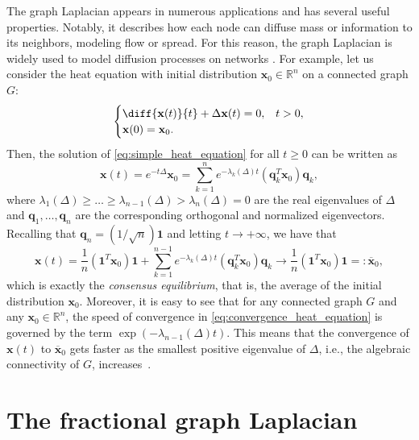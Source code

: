 \documentclass[a4paper,12pt]{article}
\newcommand{\R}{\mathbb{R}}
\newcommand{\xvec}{\mathbf{x}}
\begin{document}
 The graph Laplacian appears in numerous applications and has several useful properties. Notably, it describes how each node can diffuse mass or information to its neighbors, modeling flow or spread. For this reason, the graph Laplacian is widely used to model diffusion processes on networks \cite{Bullo_lectures}.
 For example, let us consider the heat equation with initial distribution $\mathbf{x}_0\in\R^{n}$ on a connected graph $G$:
\begin{equation} \label{eq:simple_heat_equation}
\begin{cases}
    \diff{\mathbf{x}(t)}{t} +\Delta \mathbf{x}(t) =0, & t>0, \\
    \mathbf{x}(0) = \mathbf{x}_0.
\end{cases}
\end{equation}
Then, the solution of \eqref{eq:simple_heat_equation} for all $t\geq0$ can be written as
\begin{equation*}
    \mathbf{x}(t) = e^{-t\Delta} \mathbf{x}_0 = \sum_{k=1}^n e^{-\lambda_k(\Delta)t}(\mathbf{q}_k^T\mathbf{x}_0)\mathbf{q}_k,
\end{equation*} 
where $\lambda_1(\Delta)\geq \dots \geq \lambda_{n-1}(\Delta)> \lambda_n(\Delta)=0$ are the real eigenvalues of $\Delta$ and $\mathbf{q}_1,\ldots,\mathbf{q}_n$ are the corresponding orthogonal and normalized 
eigenvectors. Recalling that $\mathbf{q}_n=(1/\sqrt{n})\mathbf{1}$ and letting $t\rightarrow+\infty$, we have that \begin{equation} \label{eq:convergence_heat_equation}
    \mathbf{x}(t) = \frac{1}{n}(\mathbf{1}^T\mathbf{x}_0)\mathbf{1} + \sum_{k=1}^{n-1} e^{-\lambda_k(\Delta)t}(\mathbf{q}_k^T\mathbf{x}_0)\mathbf{q}_k \longrightarrow \frac{1}{n}(\mathbf{1}^T\mathbf{x}_0)\mathbf{1}=:\overline{\xvec}_0,
\end{equation}
which is exactly the \emph{consensus equilibrium}, that is, the average of the initial distribution $\mathbf{x}_0$. Moreover, it is easy to see that for any connected graph $G$ and any $\mathbf{x}_0\in\R^{n}$, the speed of convergence in \eqref{eq:convergence_heat_equation} is governed by the term $\exp(-\lambda_{n-1}(\Delta)t)$. This means that the convergence of $\xvec(t)$ to $\overline{\xvec}_0$ gets faster as the smallest positive eigenvalue of $\Delta$, i.e., the algebraic connectivity of $G$, increases~\cite{Bullo_lectures}.

\section{The fractional graph Laplacian}\label{sec:fractional_laplacian}
\end{document}
